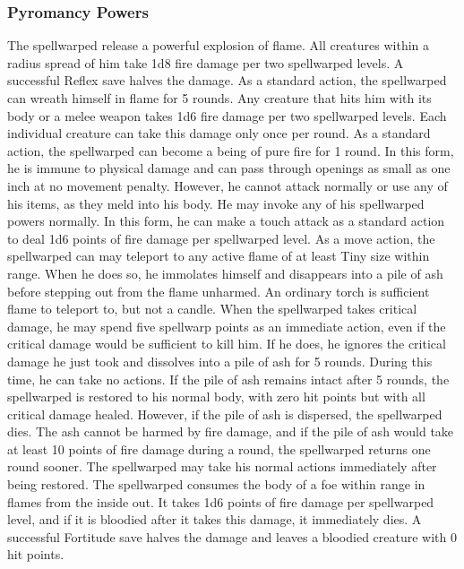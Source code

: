 \subsubsection{Pyromancy Powers}
 The spellwarped release a powerful explosion of flame. All creatures within a \areamed radius spread of him take 1d8 fire damage per two spellwarped levels. A successful Reflex save halves the damage.
 As a standard action, the spellwarped can wreath himself in flame for 5 rounds. Any creature that hits him with its body or a melee weapon takes 1d6 fire damage per two spellwarped levels. Each individual creature can take this damage only once per round.
 As a standard action, the spellwarped can become a being of pure fire for 1 round. In this form, he is immune to physical damage and can pass through openings as small as one inch at no movement penalty. However, he cannot attack normally or use any of his items, as they meld into his body. He may invoke any of his spellwarped powers normally. In this form, he can make a touch attack as a standard action to deal 1d6 points of fire damage per spellwarped level.
 As a move action, the spellwarped can may teleport to any active flame of at least Tiny size within \rngmed range. When he does so, he immolates himself and disappears into a pile of ash before stepping out from the flame unharmed. An ordinary torch is sufficient flame to teleport to, but not a candle.
 When the spellwarped takes critical damage, he may spend five spellwarp points as an immediate action, even if the critical damage would be sufficient to kill him. If he does, he ignores the critical damage he just took and dissolves into a pile of ash for 5 rounds. During this time, he can take no actions. If the pile of ash remains intact after 5 rounds, the spellwarped is restored to his normal body, with zero hit points but with all critical damage healed. However, if the pile of ash is dispersed, the spellwarped dies. The ash cannot be harmed by fire damage, and if the pile of ash would take at least 10 points of fire damage during a round, the spellwarped returns one round sooner. The spellwarped may take his normal actions immediately after being restored.
 The spellwarped consumes the body of a foe within \rngclose range in flames from the inside out. It takes 1d6 points of fire damage per spellwarped level, and if it is bloodied after it takes this damage, it immediately dies. A successful Fortitude save halves the damage and leaves a bloodied creature with 0 hit points.

